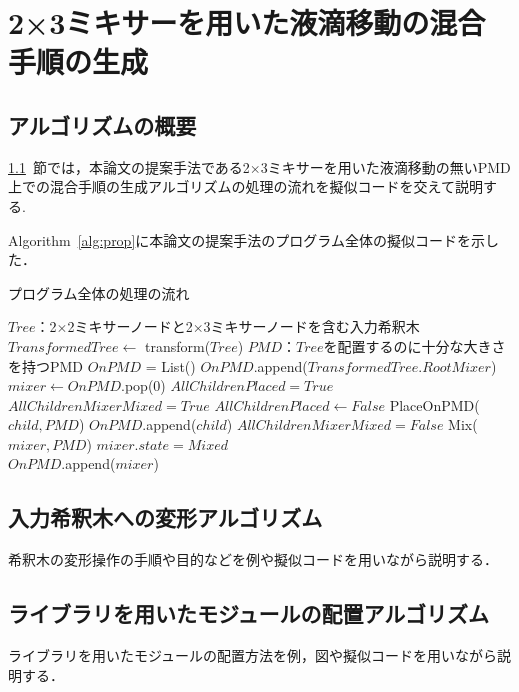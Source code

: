 \chapter{{2×3ミキサーを用いた液滴移動の混合手順の生成}}
\section{アルゴリズムの概要}
\label{overview}
\ref{overview}~節では，本論文の提案手法である2$\times$3ミキサーを用いた液滴移動の無いPMD上での混合手順の生成アルゴリズムの処理の流れを擬似コードを交えて説明する.

Algorithm~\ref{alg:prop}に本論文の提案手法のプログラム全体の擬似コードを示した．
\begin{algorithm}[tbp]
 \caption{プログラム全体の処理の流れ}\label{alg:prop}
 \begin{algorithmic}[1]
    \Require $\mathit{Tree}$：2$\times$2ミキサーノードと2$\times$3ミキサーノードを含む入力希釈木
     \State $TransformedTree \gets$ transform($Tree$) 
     \Require $\mathit{PMD}$：$\mathit{Tree}$を配置するのに十分な大きさを持つPMD  
     \State $\mathit{OnPMD}$ = List() 
     \State $\mathit{OnPMD}$.append($TransformedTree.RootMixer$)
    \State {}
        $\mathit{mixer} \gets  \mathit{OnPMD}$.pop(0)
        \State $\mathit{AllChildrenPlaced}=\mathit{True}$
        \State $\mathit{AllChildrenMixerMixed}=\mathit{True}$
                $\mathit{AllChildrenPlaced \gets False}$
                \State PlaceOnPMD($\mathit{child,PMD}$)
                \State $\mathit{OnPMD}$.append($\mathit{child}$) 
            \EndIf 
                \State $\mathit{AllChildrenMixerMixed}=\mathit{False}$
            \EndIf 
        \EndFor 
            Mix($\mathit{mixer,PMD}$)
            $\mathit{mixer.state} = \mathit{Mixed}$ \\
            $\mathit{OnPMD}$.append($\mathit{mixer}$)
        \EndIf
    \EndWhile 




 \end{algorithmic}
\end{algorithm}
\section{入力希釈木への変形アルゴリズム}
希釈木の変形操作の手順や目的などを例や擬似コードを用いながら説明する．
\section{ライブラリを用いたモジュールの配置{アルゴリズム}}
ライブラリを用いたモジュールの配置方法を例，図や擬似コードを用いながら説明する．
